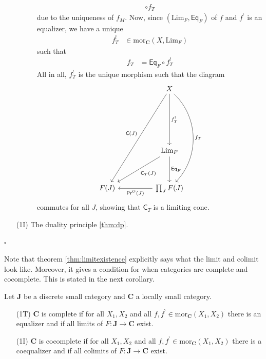 \begin{prf}
\begin{enumerate}
\begin{description}
\begin{align*}
  \circ
  f_{T}
\end{align*}
due to the uniqueness of $f_{M}$.
Now, since $(\mathrm{Lim}_{F},\mathsf{Eq}_{F})$ of $f$ and $f^{\backprime}$ is an equalizer, we have a unique
\begin{align*}
  f_{T}^{!}
  &\in
  \mathrm{mor}_{\mathbf{C}}
  \left(
    X,
    \mathrm{Lim}_{F}
  \right)
\end{align*}
such that
\begin{align*}
  f_{T}
  &=
  \mathsf{Eq}_{F}
  \circ
  f_{T}^{!}
\end{align*}
All in all, $f_{T}^{!}$ is the unique morphism such that the diagram
\[
\begin{tikzcd}[sep=huge]
  &
  X
  \arrow[bend left=45]{ddd}{f_{T}}
  \arrow{dd}{f_{T}^{!}}
  \arrow[swap]{dddl}{\mathsf{C}(J)}
  \\
  &
  \\
  &
  \mathrm{Lim}_{F}
  \arrow{d}{\mathsf{Eq}_{F}}
  \arrow{dl}{\mathsf{C}_{T}(J)}
  \\
  F(J)
  &
  \prod_{J}
  F(J)
  \arrow{l}{\mathsf{Pr}^{O}(J)}
\end{tikzcd}
\]
commutes for all $J$, showing that $\mathsf{C}_{T}$ is a limiting cone.
\end{description}
\item[(1I)]
The duality principle \ref{thm:dp}.
\end{enumerate}
\phantom{proven}
\hfill
$\square$
\end{prf}
Note that theorem \ref{thm:limitexistence} explicitly says what the limit and colimit look like.
Moreover, it gives a condition for when categories are complete and cocomplete.
This is stated in the next corollary.
\\
\begin{cor}
\label{cor:completeness}
Let $\mathbf{J}$ be a discrete small category and $\mathbf{C}$ a locally small category.
\begin{enumerate}
\item[(1T)]
$\mathbf{C}$ is complete if for all $X_{1},X_{2}$ and all $f,f^{\backprime} \in \mathrm{mor}_{\mathbf{C}}(X_{1},X_{2})$ there is an equalizer and if all limits of $F \colon \mathbf{J} \rightarrow \mathbf{C}$ exist.
\item[(1I)]
$\mathbf{C}$ is cocomplete if for all $X_{1},X_{2}$ and all $f,f^{\backprime} \in \mathrm{mor}_{\mathbf{C}}(X_{1},X_{2})$ there is a coequalizer and if all colimits of $F \colon \mathbf{J} \rightarrow \mathbf{C}$ exist.
\end{enumerate}
\end{cor}
